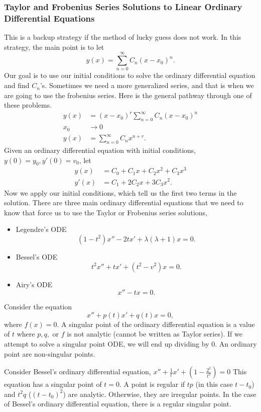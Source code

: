 \subsubsection{Taylor and Frobenius Series Solutions to Linear Ordinary Differential Equations}

This is a backup strategy if the method of lucky guess does not work. In this strategy, the main point is to let
\[
  y(x)=\sum_{n=0}^{\infty}C_n(x-x_0)^{n}
.\] 
Our goal is to use our initial conditions to solve the ordinary differential equation and find $C_n$'s. Sometimes we need a more generalized series, and that is when we are going to use the frobenius series. Here is the general pathway through one of these problems.
\begin{align*}
  y(x)&=(x-x_0)^{r}\sum_{n=0}^{\infty} C_n(x-x_0)^{n}\\
  x_0&\to 0\\
  y(x)&=\sum_{n=0}^{\infty} C_nx^{n+r}
.\end{align*}
Given an ordinary differential equation with initial conditions, $y(0)=y_0,y'(0)=v_0$, let 
\begin{align*}
  y(x)&=C_0+C_1x+C_2x^2+C_3x^3\\
  y'(x)&=C_1+2C_2x+3C_3x^2
.\end{align*}
Now we apply our initial conditions, which tell us the first two terms in the solution.
There are three main ordinary differential equations that we need to know that force us to use the Taylor or Frobenius series solutions,
\begin{itemize}
  \item Legendre's ODE
    \[
      (1-t^2)x''-2tx'+\lambda(\lambda+1)x=0
    .\] 
  \item Bessel's ODE
    \[
      t^2x''+tx'+(t^2-v^2)x=0
    .\] 
  \item Airy's ODE
    \[
    x''-tx=0
    .\] 
\end{itemize}
\begin{theorem}
  Consider the equation 
  \[
    x''+p(t)x'+q(t)x=0
  ,\] where $f(x)=0$. A singular point of the ordinary differential equation is a value of $t$ where $p,q,\text{ or }f$ is not analytic (cannot be written as Taylor series). If we attempt to solve a singular point ODE, we will end up dividing by 0. An ordinary point are non-singular points. 
\end{theorem}
Consider Bessel's ordinary differential equation, $x''+\frac{1}{t}x'+\left( 1-\frac{2^2}{t^2} \right) = 0 $ This equation has a singular point of $t=0$. A point is regular if $tp$ (in this case $t-t_0$) and $t^2q$ ($\left( t-t_0 \right) ^2$) are analytic. Otherwise, they are irregular points. In the case of Bessel's ordinary differential equation, there is a regular singular point.
